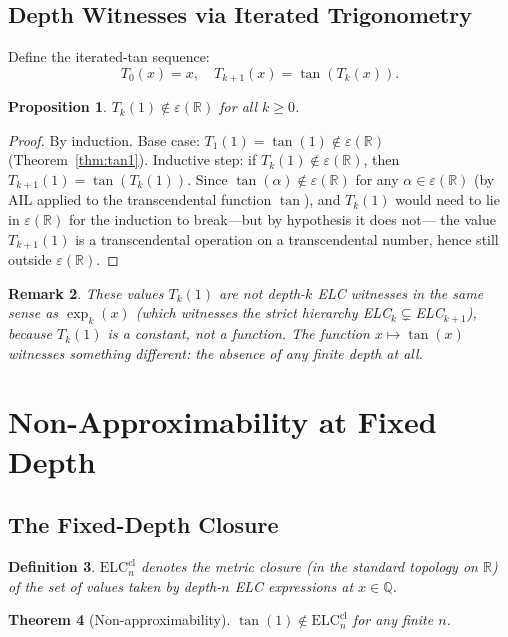 \documentclass[11pt]{article}
\newtheorem{theorem}{Theorem}
\newtheorem{proposition}[theorem]{Proposition}
\newtheorem{definition}[theorem]{Definition}
\newtheorem{remark}[theorem]{Remark}
\begin{document}
\subsection{Depth Witnesses via Iterated Trigonometry}

Define the iterated-tan sequence:
\[
T_0(x)=x,\quad T_{k+1}(x)=\tan(T_k(x)).
\]

\begin{proposition}
$T_k(1)\notin\varepsilon(\mathbb{R})$ for all $k\geq0$.
\end{proposition}

\begin{proof}
By induction. Base case: $T_1(1)=\tan(1)\notin\varepsilon(\mathbb{R})$ (Theorem~\ref{thm:tan1}).
Inductive step: if $T_k(1)\notin\varepsilon(\mathbb{R})$, then $T_{k+1}(1)=\tan(T_k(1))$.
Since $\tan(\alpha)\notin\varepsilon(\mathbb{R})$ for any $\alpha\in\varepsilon(\mathbb{R})$
(by AIL applied to the transcendental function $\tan$), and $T_k(1)$ would need to
lie in $\varepsilon(\mathbb{R})$ for the induction to break---but by hypothesis it does not---
the value $T_{k+1}(1)$ is a transcendental operation on a transcendental number, hence still
outside $\varepsilon(\mathbb{R})$.
\end{proof}

\begin{remark}
These values $T_k(1)$ are not depth-$k$ ELC witnesses in the same sense as $\exp_k(x)$
(which witnesses the strict hierarchy ELC$_k\subsetneq$ELC$_{k+1}$), because
$T_k(1)$ is a constant, not a function. The function $x\mapsto\tan(x)$ witnesses
something different: the absence of any finite depth at all.
\end{remark}

\section{Non-Approximability at Fixed Depth}

\subsection{The Fixed-Depth Closure}

\begin{definition}
$\mathrm{ELC}_n^\mathrm{cl}$ denotes the metric closure (in the standard topology on $\mathbb{R}$)
of the set of values taken by depth-$n$ ELC expressions at $x\in\mathbb{Q}$.
\end{definition}

\begin{theorem}[Non-approximability]
$\tan(1)\notin\mathrm{ELC}_n^\mathrm{cl}$ for any finite $n$.
\end{theorem}
\end{document}
